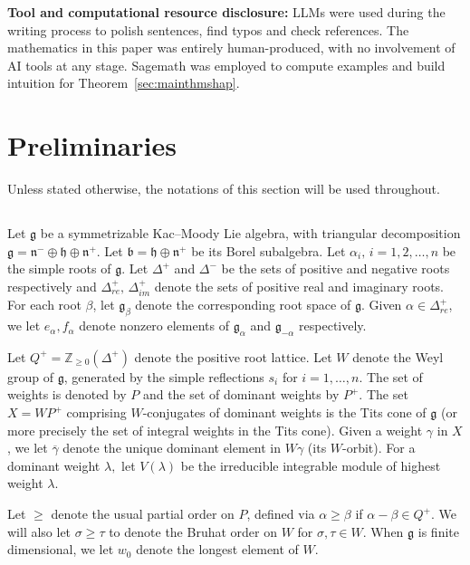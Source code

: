 \documentclass[12pt,reqno]{amsart}
\theoremstyle{plain}
\theoremstyle{definition}
\theoremstyle{remark}
\theoremstyle{plain}
\newcommand{\posreal}[1][+]{\Delta_{re}^{#1}}
\newcommand{\posimag}{\Delta_{im}^+}
\newcommand{\lie}{\mathfrak}
\begin{document}
\medskip
\noindent\textbf{Tool and computational resource disclosure:} LLMs were used during the writing process to polish sentences, find typos and check references. The mathematics in this paper was entirely human-produced, with no involvement of AI tools at any stage. Sagemath \cite{sagemath} was employed to compute examples and build intuition for Theorem~\ref{sec:mainthmshap}.


\section{Preliminaries}\label{sec:prelims}
Unless stated otherwise, the notations of this section will be used throughout.

\subsection{} Let $\mathfrak g$ be a symmetrizable Kac--Moody Lie algebra, with triangular decomposition $\mathfrak{g}=\mathfrak{n}^{-}\oplus \mathfrak{h} \oplus\mathfrak{n}^{+}$. Let $\mathfrak{b}=\mathfrak h\oplus \mathfrak{n}^+$ be its Borel subalgebra. Let $\alpha_i, \,i=1,2,\ldots,n$ be the simple roots of $\mathfrak{g}$. Let $\Delta^+$ and $\Delta^-$ be the sets of positive and negative roots respectively and $\posreal, \,\posimag$ denote the sets of positive real and imaginary roots. For each root $\beta$, let ${\lie g}_\beta$ denote the corresponding root space of ${\lie g}$. Given $\alpha \in \posreal$, we let $e_\alpha, f_\alpha$ denote nonzero elements of ${\lie g}_\alpha$ and ${\lie g}_{-\alpha}$ respectively.


Let $Q^+ = \mathbb{Z}_{\geq 0} (\Delta^+)$ denote the positive root lattice. Let $W$ denote the Weyl group of $\lie g$, generated by the simple reflections $s_i$ for $i=1, \ldots, n$. The set of weights is denoted by $P$ and the set of dominant weights by $P^+$. The set $X = WP^+$ comprising $W$-conjugates of dominant weights is the Tits cone of $\lie g$ (or more precisely the set of integral weights in the Tits cone). Given a weight $\gamma$ in $X$, we let $\overline{\gamma}$ denote the unique dominant element in $W\gamma$ (its $W$-orbit). For a dominant weight $\lambda,$ let $V(\lambda)$ be the irreducible integrable module of highest weight $\lambda$.

Let $\geq$ denote the usual partial order on $P$, defined via $\alpha \geq \beta$ if $\alpha - \beta \in Q^+$. We will also let $\sigma \geq \tau$ to denote the Bruhat order on $W$ for $\sigma, \tau \in W$. When $\lie g$ is finite dimensional, we let $w_0$ denote the longest element of $W$.
\end{document}
